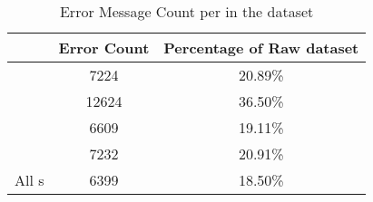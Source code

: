 \begin{table}%
    \centering
    \begin{tabular}{|lcc|}
    \hline
    \textbf{\contentType{}} & \textbf{Error Count} & \textbf{Percentage of Raw dataset} \\ \hline
    \trafilaturaTitle{} & 7224 & 20.89\% \\
    \trafilaturaAbstract{} & 12624 & 36.50\% \\
    \trafilaturaFulltext{} & 6609 & 19.11\% \\
    \translationTitle{} & 7232 & 20.91\% \\ \hline
    All \contentType{}s & 6399 & 18.50\% \\
    \hline
    \end{tabular}
    \caption{Error Message Count per \contentType{} in the \VSI{} dataset}
    \label{tab:05_vsi_error_message_count}
\end{table}
